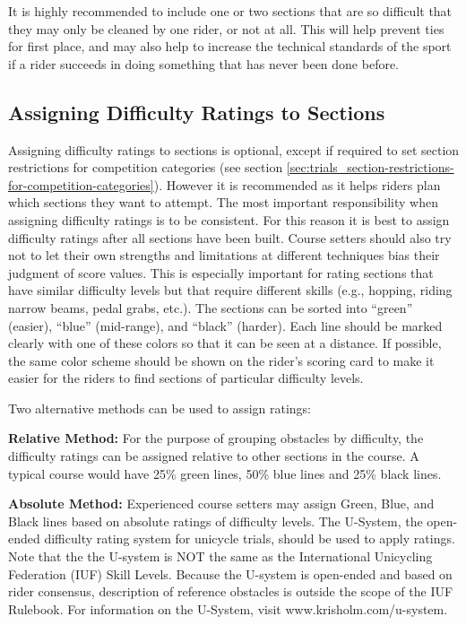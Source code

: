 It is highly recommended to include one or two sections that are so difficult that they may only be cleaned by one rider, or not at all. 
This will help prevent ties for first place, and may also help to increase the technical standards of the sport if a rider succeeds in doing something that has never been done before.

\subsection{Assigning Difficulty Ratings to Sections \label{subsec:trials_guidelines-for-course-setters_assigning-difficulty-ratings}}
Assigning difficulty ratings to sections is optional, except if required to set section restrictions for competition categories (see section \ref{sec:trials_section-restrictions-for-competition-categories}).
However it is recommended as it helps riders plan which sections they want to attempt. 
The most important responsibility when assigning difficulty ratings is to be consistent.
For this reason it is best to assign difficulty ratings after all sections have been built.
Course setters should also try not to let their own strengths and limitations at different techniques bias their judgment of score values.
This is especially important for rating sections that have similar difficulty levels but that require different skills (e.g., hopping, riding narrow beams, pedal grabs, etc.). 
The sections can be sorted into ``green'' (easier), ``blue'' (mid-range), and ``black'' (harder).
Each line should be marked clearly with one of these colors so that it can be seen at a distance.
If possible, the same color scheme should be shown on the rider's scoring card to make it easier for the riders to find sections of particular difficulty levels.

Two alternative methods can be used to assign ratings:

\textbf{Relative Method:}
For the purpose of grouping obstacles by difficulty, the difficulty ratings can be assigned relative to other sections in the course. A typical course would have 25\% green lines, 50\% blue lines and 25\% black lines.

\textbf{Absolute Method:}
Experienced course setters may assign Green, Blue, and Black lines based on absolute ratings of difficulty levels.
The U-System, the open-ended difficulty rating system for unicycle trials, should be used to apply ratings.
Note that the the U-system is NOT the same as the International Unicycling Federation (IUF) Skill Levels.
Because the U-system is open-ended and based on rider consensus, description of reference obstacles is outside the scope of the IUF Rulebook.
For information on the U-System, visit www.krisholm.com/u-system.

